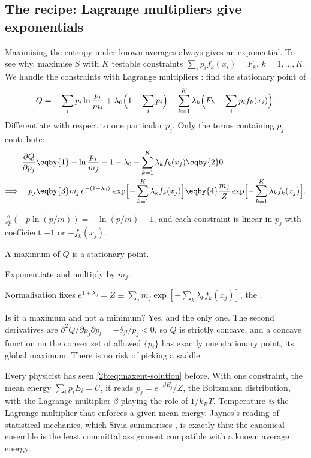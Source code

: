 \subsection{The recipe: Lagrange multipliers give exponentials}
\label{2b:sec:maxent-recipe}

Maximising the entropy under known averages always gives an exponential. To see why, maximise $S$ with $K$ testable constraints $\sum_i p_i f_k(x_i)=F_k$, $k=1,\dots,K$. We handle the constraints with Lagrange multipliers : find the stationary point of
\begin{equation*}
  Q=-\sum_i p_i\ln\frac{p_i}{m_i}+\lambda_0\Bigl(1-\sum_i p_i\Bigr)+\sum_{k=1}^K\lambda_k\Bigl(F_k-\sum_i p_i f_k(x_i)\Bigr).
\end{equation*}
Differentiate with respect to one particular $p_j$. Only the terms containing $p_j$ contribute:
\begin{align}
  \frac{\partial Q}{\partial p_j}
  &\eqby{1} -\ln\frac{p_j}{m_j}-1-\lambda_0-\sum_{k=1}^K\lambda_kf_k(x_j) \eqby{2} 0 \nonumber\\
  \Longrightarrow\quad p_j
  &\eqby{3} m_j\,e^{-(1+\lambda_0)}\,\exp\Bigl[-\sum_{k=1}^K\lambda_kf_k(x_j)\Bigr]
   \eqby{4} \frac{m_j}{Z}\exp\Bigl[-\sum_{k=1}^K\lambda_kf_k(x_j)\Bigr].
  \label{2b:eq:maxent-solution}
\end{align}
\begin{explain}
  \item $\frac{\dd}{\dd p}(-p\ln(p/m))=-\ln(p/m)-1$, and each constraint is linear in $p_j$ with coefficient $-1$ or $-f_k(x_j)$.
  \item A maximum of $Q$ is a stationary point.
  \item Exponentiate and multiply by $m_j$.
  \item Normalisation fixes $e^{1+\lambda_0}=Z\equiv\sum_j m_j\exp[-\sum_k\lambda_kf_k(x_j)]$, the .
\end{explain}
Is it a maximum and not a minimum? Yes, and the only one. The second derivatives are $\partial^2Q/\partial p_j\partial p_l=-\delta_{jl}/p_j<0$, so $Q$ is strictly concave, and a concave function on the convex set of allowed $\{p_i\}$ has exactly one stationary point, its global maximum. There is no risk of picking a saddle.

Every physicist has seen \eqref{2b:eq:maxent-solution} before. With one constraint, the mean energy $\sum_ip_iE_i=U$, it reads $p_j=e^{-\beta E_j}/Z$, the Boltzmann distribution, with the Lagrange multiplier $\beta$ playing the role of $1/k_BT$. Temperature \emph{is} the Lagrange multiplier that enforces a given mean energy. Jaynes's reading of statistical mechanics, which Sivia summarises , is exactly this: the canonical ensemble is the least committal assignment compatible with a known average energy.

